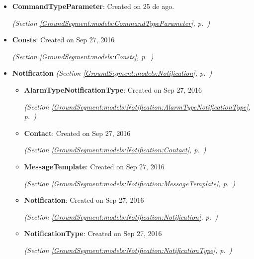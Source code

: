 \begin{itemize}
\item \textbf{CommandTypeParameter}: Created on 25 de ago.



  \textit{(Section \ref{GroundSegment:models:CommandTypeParameter}, p.~\pageref{GroundSegment:models:CommandTypeParameter})}

\item \textbf{Consts}: Created on Sep 27, 2016



  \textit{(Section \ref{GroundSegment:models:Consts}, p.~\pageref{GroundSegment:models:Consts})}

\item \textbf{Notification}
  \textit{(Section \ref{GroundSegment:models:Notification}, p.~\pageref{GroundSegment:models:Notification})}

  \begin{itemize}
\setlength{\parskip}{0ex}
    \item \textbf{AlarmTypeNotificationType}: Created on Sep 27, 2016



  \textit{(Section \ref{GroundSegment:models:Notification:AlarmTypeNotificationType}, p.~\pageref{GroundSegment:models:Notification:AlarmTypeNotificationType})}

    \item \textbf{Contact}: Created on Sep 27, 2016



  \textit{(Section \ref{GroundSegment:models:Notification:Contact}, p.~\pageref{GroundSegment:models:Notification:Contact})}

    \item \textbf{MessageTemplate}: Created on Sep 27, 2016



  \textit{(Section \ref{GroundSegment:models:Notification:MessageTemplate}, p.~\pageref{GroundSegment:models:Notification:MessageTemplate})}

    \item \textbf{Notification}: Created on Sep 27, 2016



  \textit{(Section \ref{GroundSegment:models:Notification:Notification}, p.~\pageref{GroundSegment:models:Notification:Notification})}

    \item \textbf{NotificationType}: Created on Sep 27, 2016



  \textit{(Section \ref{GroundSegment:models:Notification:NotificationType}, p.~\pageref{GroundSegment:models:Notification:NotificationType})}


\end{itemize}
\end{itemize}
